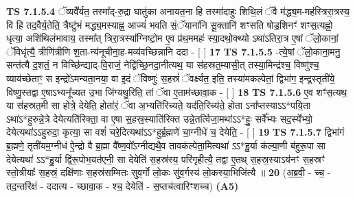 \documentclass[17pt]{extarticle}
\begin{document}
                  \newline
                                \textbf{ TS 7.1.5.4} \newline
                  ॅव्यवै᳚र्यत॒ तस्मा᳚द्-रु॒द्रा घातु॑का अनायत॒ना हि तस्मा॑दाहुः शिथि॒लं ॅवै म॑द्ध्य॒म-मह॑स्त्रिरा॒त्रस्य॒ वि हि तद॒वैर्य॒तेति॒ त्रैष्टु॑भं मद्ध्य॒मस्याह्न॒ आज्यं॑ भवति सं॒ॅयाना॑नि सू॒क्तानि॑ शꣳसति षोड॒शिनꣳ॑ शꣳस॒त्यह्नो॒ धृत्या॒ अशि॑थिलंभावाय॒ तस्मा᳚त् त्रिरा॒त्रस्या᳚ग्निष्टो॒म ए॒व प्र॑थ॒ममहः॑ स्या॒दथो॒क्थ्यो ऽथा॑ऽतिरा॒त्र ए॒षां ॅलो॒कानां॒ ॅविधृ॑त्यै॒ त्रीणि॑त्रीणि श॒ता-न्य॑नूचीना॒ह-मव्य॑वच्छिन्नानि ददा - [  ] \textbf{  17} \newline
                  \newline
                                \textbf{ TS 7.1.5.5} \newline
                  -त्ये॒षां ॅलो॒काना॒मनु॒ सन्त॑त्यै द॒शतं॒ न विच्छि॑न्द्याद्-वि॒राजं॒ नेद्वि॑च्छि॒नदा॒नीत्यथ॒ या स॑हस्रत॒म्यासी॒त् तस्या॒मिन्द्र॑श्च॒ विष्णु॑श्च॒ व्याय॑च्छेताꣳ॒॒ स इन्द्रो॑ऽमन्यता॒नया॒ वा इ॒दं ॅविष्णुः॑ स॒हस्रं॑ ॅवर्क्ष्यत॒ इति॒ तस्या॑मकल्पेतां॒ द्विभा॑ग॒ इन्द्र॒स्तृती॑ये॒ विष्णु॒स्तद्वा ए॒षाऽभ्यनू᳚च्यत उ॒भा जि॑ग्यथु॒रिति॒ तां ॅवा ए॒ताम॑च्छावा॒क - [  ] \textbf{  18} \newline
                  \newline
                                \textbf{ TS 7.1.5.6} \newline
                  ए॒व शꣳ॑स॒त्यथ॒ या स॑हस्रत॒मी सा होत्रे॒ देयेति॒ होता॑रं॒ ॅवा अ॒भ्यति॑रिच्यते॒ यद॑ति॒रिच्य॑ते॒ होता ऽना᳚प्तस्याऽऽ*पयि॒ता ऽथा॑ऽ*हुरुन्ने॒त्रे देयेत्यति॑रिक्ता॒ वा ए॒षा स॒हस्र॒स्याति॑रिक्त उन्ने॒तर्त्विजा॒मथा॑ऽऽ*हुः॒ सर्वे᳚भ्यः सद॒स्ये᳚भ्यो॒ देयेत्यथा॑ऽऽहुरुदा॒ कृत्या॒ सा वशं॑ चरे॒दित्यथा॑ऽऽ*हुर्ब्र॒ह्मणे॑ चा॒ग्नीधे॑ च॒ देयेति॒ - [  ] \textbf{  19} \newline
                  \newline
                                \textbf{ TS 7.1.5.7} \newline
                  द्विभा॑गं ब्र॒ह्मणे॒ तृती॑यम॒ग्नीध॑ ऐ॒न्द्रो वै ब्र॒ह्मा वै᳚ष्ण॒वो᳚ऽग्नीद्यथै॒व तावक॑ल्पेता॒मित्यथा॑ ऽऽ*हु॒र्या क॑ल्या॒णी ब॑हुरू॒पा सा देयेत्यथा॑ ऽऽ*हु॒र्या द्वि॑रू॒पोभ॒यत॑एनी॒ सा देयेति॑ स॒हस्र॑स्य॒ परि॑गृहीत्यै॒ तद्वा ए॒तथ् स॒हस्र॒स्याऽय॑नꣳ स॒हस्रꣳ॑ स्तो॒त्रीयाः᳚ स॒हस्रं॒ दक्षि॑णाः स॒हस्र॑सम्मितः सुव॒र्गो लो॒कः सु॑व॒र्गस्य॑ लो॒कस्या॒भिजि॑त्यै ॥ \textbf{  20} \newline
                  \newline
                      (अ॒ब्र॒वी॒ - च्च॒ - तद॒न्तरि॑क्षं - ददात्य - च्छावा॒क - श्च॒ देयेति॑ - स॒प्तच॑त्वारिꣳशच्च)  \textbf{(A5)} \newline \newline
\end{document}
